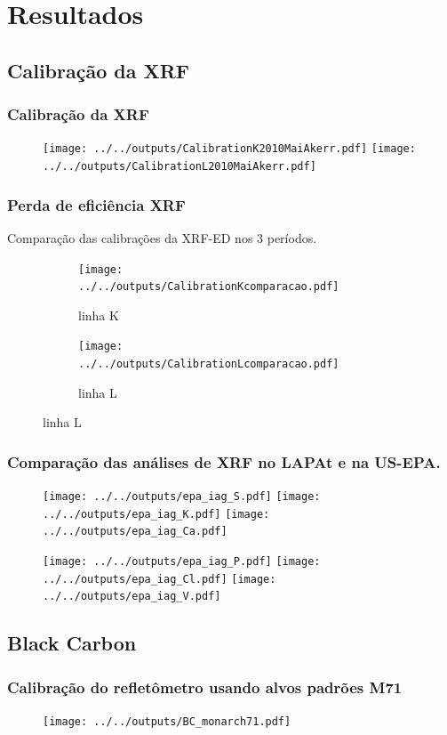 \section{Resultados}

\subsection{Calibração da XRF}

\begin{frame}
  \frametitle{Calibração da XRF}
  \begin{figure}
      \centering
      \texttt{[image: ../../outputs/CalibrationK2010MaiAkerr.pdf]}
      \texttt{[image: ../../outputs/CalibrationL2010MaiAkerr.pdf]}
  \end{figure}
\end{frame}

\begin{frame}
  \frametitle{Perda de eficiência XRF}
  Comparação das calibrações da XRF-ED nos 3 períodos.
  \begin{figure}[H]
    \begin{subfigure}[b]{0.5\textwidth}
      \texttt{[image: ../../outputs/CalibrationKcomparacao.pdf]}
      \caption{linha K}
    \end{subfigure}%
    \begin{subfigure}[b]{0.5\textwidth}
      \texttt{[image: ../../outputs/CalibrationLcomparacao.pdf]}
      \caption{linha L}
    \end{subfigure}
  \end{figure}
\end{frame}


\begin{frame}
  \frametitle{Comparação das análises de XRF no LAPAt e na US-EPA.}
  \begin{figure}[H]
    \centering
      \texttt{[image: ../../outputs/epa\_iag\_S.pdf]}
      \texttt{[image: ../../outputs/epa\_iag\_K.pdf]}
      \texttt{[image: ../../outputs/epa\_iag\_Ca.pdf]}
  \end{figure}
    \begin{figure}[H]
    	\centering
    	\texttt{[image: ../../outputs/epa\_iag\_P.pdf]}
    	\texttt{[image: ../../outputs/epa\_iag\_Cl.pdf]}
    	\texttt{[image: ../../outputs/epa\_iag\_V.pdf]}
    \end{figure}
\end{frame}

\subsection{Black Carbon}
\begin{frame}
  \frametitle{Calibração do refletômetro usando alvos padrões M71}
  \begin{figure}[H]
    \centering
    \texttt{[image: ../../outputs/BC\_monarch71.pdf]}
  \end{figure}
\end{frame}

